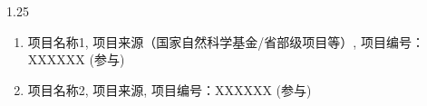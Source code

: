 \begin{project}
\renewcommand{\labelenumi}{[\arabic{enumi}]}
\begin{spacing}{1.25}
   \begin{enumerate}
    \item 项目名称1, 项目来源（国家自然科学基金/省部级项目等）, 项目编号：XXXXXX (参与)
    \item 项目名称2, 项目来源, 项目编号：XXXXXX (参与)
   \end{enumerate}
\end{spacing}
\end{project}
